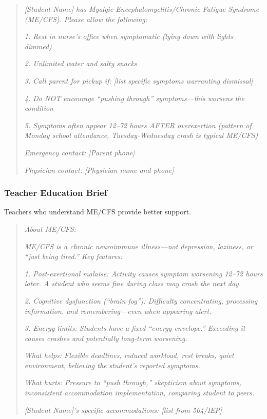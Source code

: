 \begin{quote}
\textit{[Student Name] has Myalgic Encephalomyelitis/Chronic Fatigue Syndrome (ME/CFS). Please allow the following:}

\textit{1. Rest in nurse's office when symptomatic (lying down with lights dimmed)}

\textit{2. Unlimited water and salty snacks}

\textit{3. Call parent for pickup if: [list specific symptoms warranting dismissal]}

\textit{4. Do NOT encourage ``pushing through'' symptoms---this worsens the condition}

\textit{5. Symptoms often appear 12--72 hours AFTER overexertion (pattern of Monday school attendance, Tuesday-Wednesday crash is typical ME/CFS)}

\textit{Emergency contact: [Parent phone]}

\textit{Physician contact: [Physician name and phone]}
\end{quote}

\subsubsection{Teacher Education Brief}

Teachers who understand ME/CFS provide better support.

\begin{quote}
\textit{About ME/CFS:}

\textit{ME/CFS is a chronic neuroimmune illness---not depression, laziness, or ``just being tired.'' Key features:}

\textit{1. Post-exertional malaise: Activity causes symptom worsening 12--72 hours later. A student who seems fine during class may crash the next day.}

\textit{2. Cognitive dysfunction (``brain fog''): Difficulty concentrating, processing information, and remembering---even when appearing alert.}

\textit{3. Energy limits: Students have a fixed ``energy envelope.'' Exceeding it causes crashes and potentially long-term worsening.}

\textit{What helps: Flexible deadlines, reduced workload, rest breaks, quiet environment, believing the student's reported symptoms.}

\textit{What hurts: Pressure to ``push through,'' skepticism about symptoms, inconsistent accommodation implementation, comparing student to peers.}

\textit{[Student Name]'s specific accommodations: [list from 504/IEP]}
\end{quote}

